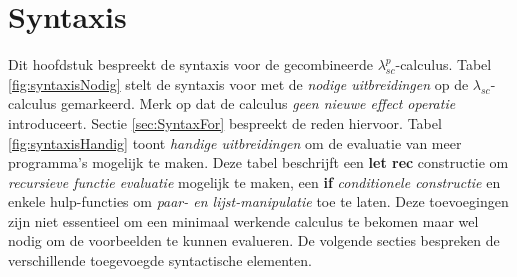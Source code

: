 \chapter{Syntaxis}
\label{hoofdstuk:syntaxis}


Dit hoofdstuk bespreekt de syntaxis voor de gecombineerde $\lambda_{sc}^p$-calculus. Tabel \ref{fig:syntaxisNodig} stelt de syntaxis voor met de \emph{nodige uitbreidingen} op de $\lambda_{sc}$-calculus gemarkeerd. 
Merk op dat de calculus \emph{geen nieuwe effect operatie} introduceert. Sectie \ref{sec:SyntaxFor} bespreekt de reden hiervoor. \newline
Tabel \ref{fig:syntaxisHandig} toont \emph{handige uitbreidingen} om de evaluatie van meer programma's mogelijk te maken. Deze tabel beschrijft een \textbf{let rec} constructie om \emph{recursieve functie evaluatie} mogelijk te maken, een \textbf{if} \emph{conditionele constructie} en enkele hulp-functies om \emph{paar- en lijst-manipulatie} toe te laten. Deze toevoegingen zijn niet essentieel om een minimaal werkende calculus te bekomen maar wel nodig om de voorbeelden te kunnen evalueren. De volgende secties bespreken de verschillende toegevoegde syntactische elementen.

